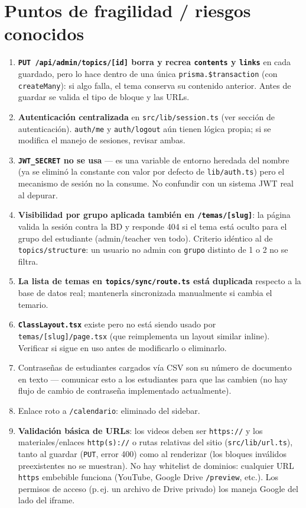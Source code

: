 \documentclass[11pt,a4paper]{article}
\newcommand{\code}[1]{\texttt{#1}}
\begin{document}
\section{Puntos de fragilidad / riesgos conocidos}
\label{sec:riesgos}

\begin{enumerate}
  \item \textbf{\code{PUT /api/admin/topics/[id]} borra y recrea \code{contents} y \code{links}} en cada guardado, pero lo hace dentro de una única \code{prisma.\$transaction} (con \code{createMany}): si algo falla, el tema conserva su contenido anterior. Antes de guardar se valida el tipo de bloque y las URLs.
  \item \textbf{Autenticación centralizada} en \code{src/lib/session.ts} (ver sección de autenticación). \code{auth/me} y \code{auth/logout} aún tienen lógica propia; si se modifica el manejo de sesiones, revisar ambas.
  \item \textbf{\code{JWT\_SECRET} no se usa} --- es una variable de entorno heredada del nombre (ya se eliminó la constante con valor por defecto de \code{lib/auth.ts}) pero el mecanismo de sesión no la consume. No confundir con un sistema JWT real al depurar.
  \item \textbf{Visibilidad por grupo aplicada también en \code{/temas/[slug]}}: la página valida la sesión contra la BD y responde 404 si el tema está oculto para el grupo del estudiante (admin/teacher ven todo). Criterio idéntico al de \code{topics/structure}: un usuario no admin con \code{grupo} distinto de 1 o 2 no se filtra.
  \item \textbf{La lista de temas en \code{topics/sync/route.ts} está duplicada} respecto a la base de datos real; mantenerla sincronizada manualmente si cambia el temario.
  \item \textbf{\code{ClassLayout.tsx}} existe pero no está siendo usado por \code{temas/[slug]/page.tsx} (que reimplementa un layout similar inline). Verificar si sigue en uso antes de modificarlo o eliminarlo.
  \item Contraseñas de estudiantes cargados vía CSV son su número de documento en texto --- comunicar esto a los estudiantes para que las cambien (no hay flujo de cambio de contraseña implementado actualmente).
  \item Enlace roto a \code{/calendario}: eliminado del sidebar.
  \item \textbf{Validación básica de URLs}: los videos deben ser \code{https://} y los materiales/enlaces \code{http(s)://} o rutas relativas del sitio (\code{src/lib/url.ts}), tanto al guardar (\code{PUT}, error 400) como al renderizar (los bloques inválidos preexistentes no se muestran). No hay whitelist de dominios: cualquier URL \code{https} embebible funciona (YouTube, Google Drive \code{/preview}, etc.). Los permisos de acceso (p.\,ej. un archivo de Drive privado) los maneja Google del lado del iframe.
\end{enumerate}
\end{document}
